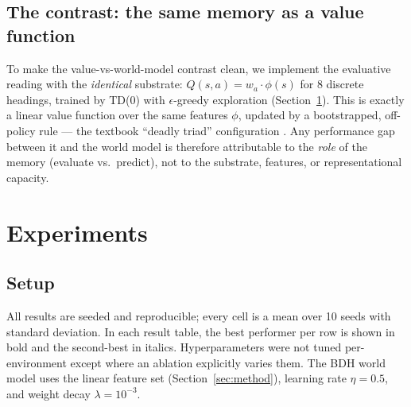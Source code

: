 \documentclass[11pt]{article}
\begin{document}
\subsection{The contrast: the same memory as a value function}

To make the value-vs-world-model contrast clean, we implement the evaluative reading with the
\emph{identical} substrate: $Q(s,a) = w_a \cdot \phi(s)$ for $8$ discrete headings, trained by
TD(0) \cite{sutton1988} with $\epsilon$-greedy exploration (Section~\ref{sec:experiments}).
This is exactly a linear value function over the same features $\phi$, updated by a
bootstrapped, off-policy rule --- the textbook ``deadly triad'' configuration
\cite{sutton2018}. Any performance gap between it and the world model is therefore attributable
to the \emph{role} of the memory (evaluate vs.\ predict), not to the substrate, features, or
representational capacity.

\section{Experiments}\label{sec:experiments}

\subsection{Setup}

All results are seeded and reproducible; every cell is a mean over 10 seeds with standard
deviation. In each result table, the best performer per row is shown in bold and the
second-best in italics. Hyperparameters were not tuned per-environment except where an ablation explicitly
varies them. The BDH world model uses the linear feature set (Section~\ref{sec:method}),
learning rate $\eta = 0.5$, and weight decay $\lambda = 10^{-3}$.
\end{document}
